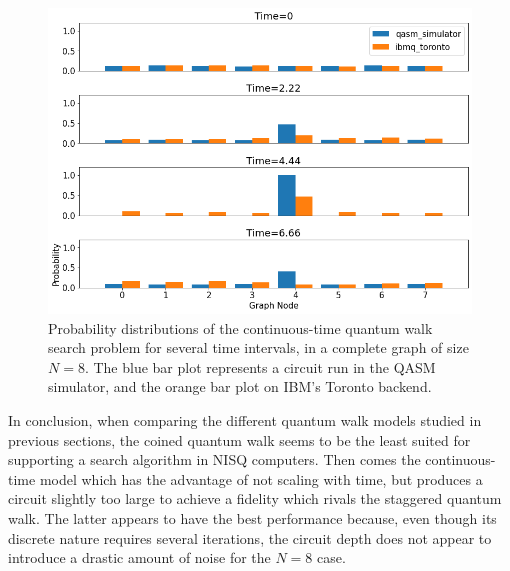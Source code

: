 \documentclass[../../dissertation.tex]{subfiles}
\begin{document}
\begin{figure}[!h]
	\centering
	\includegraphics[scale=0.40]{img/Qiskit/ContQuantumWalk/Search/ContQW_N3_S2.png}
	\caption{Probability distributions of the continuous-time quantum walk search problem for several time intervals, in a complete graph of size $N=8$. The blue bar plot represents a circuit run in the QASM simulator, and the orange bar plot on IBM's Toronto backend.}
	\label{fig:contSearchResultCircQistkit}
\end{figure}\par

In conclusion, when comparing the different quantum walk models studied in
previous sections, the coined quantum walk seems to be the least suited for
supporting a search algorithm in NISQ computers. Then comes the continuous-time
model which has the advantage of not scaling with time, but produces a circuit
slightly too large to achieve a fidelity which rivals the staggered quantum
walk. The latter appears to have the best performance because, even though its discrete
nature requires several iterations, the circuit depth does not appear to
introduce a drastic amount of noise for the $N=8$ case. 
\end{document}
